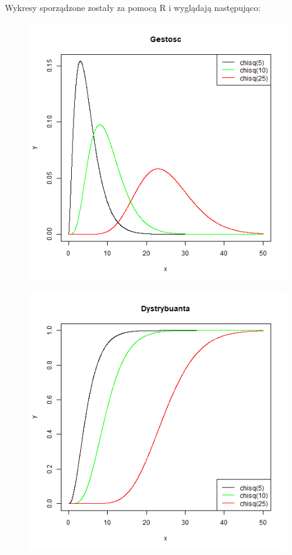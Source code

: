 \documentclass{article}
\begin{document}
Wykresy sporządzone zostały za pomocą R i wyglądają następująco:
\begin{figure}[h!]
\begin{center}
\includegraphics[height=0.5\textheight, angle=0]{"chi_gestosc.png"}
\end{center}
\end{figure}

\newpage
\begin{figure}[h!]
\begin{center}
\includegraphics[height=0.5\textheight, angle=0]{"chi_dystrybuanta.png"}
\end{center}
\end{figure}
\end{document}
